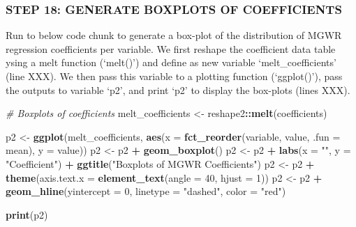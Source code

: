 \documentclass[
  12pt,
]{article}
\newenvironment{Shaded}{\begin{snugshade}}{\end{snugshade}}
\newcommand{\AttributeTok}[1]{\textcolor[rgb]{0.13,0.29,0.53}{#1}}
\newcommand{\CommentTok}[1]{\textcolor[rgb]{0.56,0.35,0.01}{\textit{#1}}}
\newcommand{\DecValTok}[1]{\textcolor[rgb]{0.00,0.00,0.81}{#1}}
\newcommand{\FunctionTok}[1]{\textcolor[rgb]{0.13,0.29,0.53}{\textbf{#1}}}
\newcommand{\NormalTok}[1]{#1}
\newcommand{\OtherTok}[1]{\textcolor[rgb]{0.56,0.35,0.01}{#1}}
\newcommand{\SpecialCharTok}[1]{\textcolor[rgb]{0.81,0.36,0.00}{\textbf{#1}}}
\newcommand{\StringTok}[1]{\textcolor[rgb]{0.31,0.60,0.02}{#1}}
\begin{document}
\hypertarget{step-18-generate-boxplots-of-coefficients}{%
\subsubsection{STEP 18: GENERATE BOXPLOTS OF
COEFFICIENTS}\label{step-18-generate-boxplots-of-coefficients}}

Run to below code chunk to generate a box-plot of the distribution of
MGWR regression coefficients per variable. We first reshape the
coefficient data table ysing a melt function (`melt()') and define as
new variable `melt\_coefficients' (line XXX). We then pass this variable
to a plotting function (`ggplot()'), pass the outputs to variable `p2',
and print `p2' to display the box-plots (lines XXX).

\begin{Shaded}
\begin{Highlighting}[]
\CommentTok{\# Boxplots of coefficients}
\NormalTok{melt\_coefficients }\OtherTok{\textless{}{-}}\NormalTok{ reshape2}\SpecialCharTok{::}\FunctionTok{melt}\NormalTok{(coefficients)}

\NormalTok{p2 }\OtherTok{\textless{}{-}} \FunctionTok{ggplot}\NormalTok{(melt\_coefficients, }\FunctionTok{aes}\NormalTok{(}\AttributeTok{x =} \FunctionTok{fct\_reorder}\NormalTok{(variable, value, }\AttributeTok{.fun =}\NormalTok{ mean), }\AttributeTok{y =}\NormalTok{ value))}
\NormalTok{p2 }\OtherTok{\textless{}{-}}\NormalTok{ p2 }\SpecialCharTok{+} \FunctionTok{geom\_boxplot}\NormalTok{()}
\NormalTok{p2 }\OtherTok{\textless{}{-}}\NormalTok{ p2 }\SpecialCharTok{+} \FunctionTok{labs}\NormalTok{(}\AttributeTok{x =} \StringTok{""}\NormalTok{, }\AttributeTok{y =} \StringTok{"Coefficient"}\NormalTok{) }\SpecialCharTok{+} \FunctionTok{ggtitle}\NormalTok{(}\StringTok{"Boxplots of MGWR Coefficients"}\NormalTok{)}
\NormalTok{p2 }\OtherTok{\textless{}{-}}\NormalTok{ p2 }\SpecialCharTok{+} \FunctionTok{theme}\NormalTok{(}\AttributeTok{axis.text.x =} \FunctionTok{element\_text}\NormalTok{(}\AttributeTok{angle =} \DecValTok{40}\NormalTok{, }\AttributeTok{hjust =} \DecValTok{1}\NormalTok{))}
\NormalTok{p2 }\OtherTok{\textless{}{-}}\NormalTok{ p2 }\SpecialCharTok{+} \FunctionTok{geom\_hline}\NormalTok{(}\AttributeTok{yintercept =} \DecValTok{0}\NormalTok{, }\AttributeTok{linetype =} \StringTok{"dashed"}\NormalTok{, }\AttributeTok{color =} \StringTok{"red"}\NormalTok{)}

\FunctionTok{print}\NormalTok{(p2)}
\end{Highlighting}
\end{Shaded}
\end{document}
